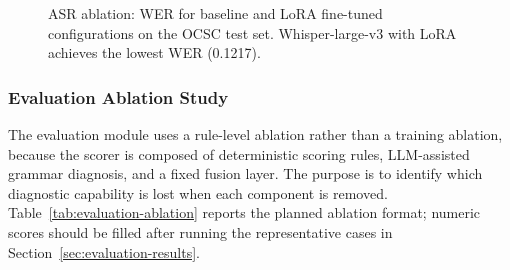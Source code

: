 \documentclass{article}
\begin{document}
\begin{figure}[t]
\centering
{}
\caption{ASR ablation: WER for baseline and LoRA fine-tuned
         configurations on the OCSC test set.
         Whisper-large-v3 with LoRA achieves the lowest WER (0.1217).}
\label{fig:asr-wer}
\end{figure}

\subsubsection{Evaluation Ablation Study}
\label{sec:evaluation-ablation}

The evaluation module uses a rule-level ablation rather than a training
ablation, because the scorer is composed of deterministic scoring rules,
LLM-assisted grammar diagnosis, and a fixed fusion layer. The purpose is
to identify which diagnostic capability is lost when each component is
removed. Table~\ref{tab:evaluation-ablation} reports the planned ablation
format; numeric scores should be filled after running the representative
cases in Section~\ref{sec:evaluation-results}.
\end{document}
